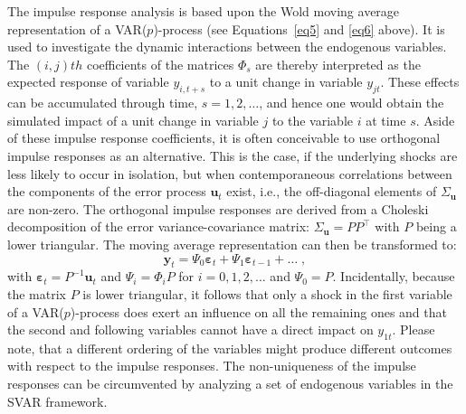 \documentclass[nojss]{jss}
\begin{document}
The impulse response analysis is based upon the Wold moving average
representation of a VAR($p$)-process (see Equations~\ref{eq5}
and \ref{eq6} above). It is used to investigate the dynamic
interactions between the endogenous variables. The $(i, j)th$
coefficients of the matrices $\Phi_s$ are thereby interpreted as the
expected response of variable $y_{i, t+s}$ to a unit change in
variable $y_{jt}$. These effects can be accumulated through time, $s = 1,
2, \ldots$, and hence one would obtain the simulated impact of a unit
change in variable $j$ to the variable $i$ at time $s$. Aside of these
impulse response coefficients, it is often conceivable to use
orthogonal impulse responses as an alternative. This is the case, if
the underlying shocks are less likely to occur in isolation, but
when contemporaneous correlations between the components of the
error process $\bm{u}_t$ exist, i.e., the off-diagonal elements of
$\Sigma_{\bm{u}}$ are non-zero. The orthogonal impulse
responses are derived from a Choleski decomposition of the error
variance-covariance matrix: $\Sigma_{\bm{u}} = P P^\top$ with $P$
being a lower triangular. The moving average representation can then
be transformed to:  
\begin{equation}
\label{eq19}
\bm{y}_t = \Psi_0 \bm{\varepsilon}_t + \Psi_1 \bm{\varepsilon}_{t-1} +
\ldots \;,  
\end{equation}
with $\bm{\varepsilon}_t = P^{-1}\bm{u}_t$ and $\Psi_i =
\Phi_i P$ for $i = 0, 1, 2, \ldots$ and $\Psi_0 = P$. Incidentally,
because the matrix $P$ is lower triangular, it follows that only a
shock in the first variable of a VAR($p$)-process does exert an
influence on all the remaining ones and that the second and following
variables cannot have a direct impact on $y_{1t}$. Please note, that a
different ordering of the variables might produce different outcomes
with respect to the impulse responses. The non-uniqueness of the
impulse responses can be circumvented by analyzing a set of endogenous
variables in the SVAR framework.
\end{document}
